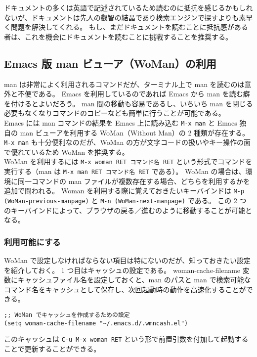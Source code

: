 ドキュメントの多くは英語で記述されているため読むのに抵抗を感じるかもしれないが、ドキュメントは先人の叡智の結晶であり検索エンジンで探すよりも素早く問題を解決してくれる。
もし、まだドキュメントを読むことに抵抗感がある者は、これを機会にドキュメントを読むことに挑戦することを推奨する。
\subsection{Emacs 版 man ビューア（WoMan）の利用}
man は非常によく利用されるコマンドだが、ターミナル上で man を読むのは意外と不便である。
Emacs を利用しているのであれば Emacs から man を読む癖を付けるとよいだろう。
man 間の移動も容易であるし、いちいち man を閉じる必要もなくなりコマンドのコピーなども簡単に行うことが可能である。\\

Emacs には man コマンドの結果を Emacs 上に読み込む \texttt{M-x man} と Emacs 独自の man ビューアを利用する WoMan（Without Man）の 2 種類が存在する。
\texttt{M-x man} も十分便利なのだが、WoMan の方が文字コードの扱いやキー操作の面で優れているため WoMan を推奨する。\\

WoMan を利用するには \texttt{M-x woman RET コマンド名 RET} という形式でコマンドを実行する（man は \texttt{M-x man RET コマンド名 RET} である）。
WoMan の場合は、環境に同一コマンドの man ファイルが複数存在する場合、どちらを利用するかを追加で問われる。
Woman を利用する際に覚えておきたいキーバインドは \texttt{M-p (WoMan-previous-manpage)} と \texttt{M-n (WoMan-next-manpage)} である。
この 2 つのキーバインドによって、ブラウザの戻る／進むのように移動することが可能となる。
\subsubsection{利用可能にする}
WoMan で設定しなければならない項目は特にないのだが、知っておきたい設定を紹介しておく。
1 つ目はキャッシュの設定である。
woman-cache-filename 変数にキャッシュファイル名を設定しておくと、man のパスと man で検索可能なコマンド名をキャッシュとして保存し、次回起動時の動作を高速化することができる。
\begin{mdframed}[roundcorner=0.50zw,leftmargin=3.00zw,rightmargin=3.00zw,skipabove=0.40zw,skipbelow=0.40zw,innertopmargin=4.00pt,innerbottommargin=4.00pt,innerleftmargin=5.00pt,innerrightmargin=5.00pt,linecolor=gray!020,linewidth=0.50pt,backgroundcolor=gray!20]
\begin{verbatim}
;; WoMan でキャッシュを作成するための設定
(setq woman-cache-filename "~/.emacs.d/.wmncash.el")
\end{verbatim}
\end{mdframed}
このキャッシュは \texttt{C-u M-x woman RET} という形で前置引数を付加して起動することで更新することができる。\\

